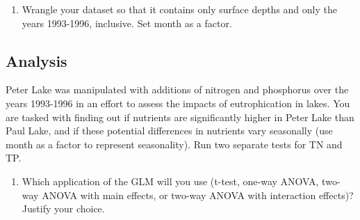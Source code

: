 \documentclass[]{article}
\newenvironment{Shaded}{\begin{snugshade}}{\end{snugshade}}
\newcommand{\CommentTok}[1]{\textcolor[rgb]{0.56,0.35,0.01}{\textit{#1}}}
\newcommand{\DecValTok}[1]{\textcolor[rgb]{0.00,0.00,0.81}{#1}}
\newcommand{\FloatTok}[1]{\textcolor[rgb]{0.00,0.00,0.81}{#1}}
\newcommand{\KeywordTok}[1]{\textcolor[rgb]{0.13,0.29,0.53}{\textbf{#1}}}
\newcommand{\NormalTok}[1]{#1}
\newcommand{\OperatorTok}[1]{\textcolor[rgb]{0.81,0.36,0.00}{\textbf{#1}}}
\newcommand{\StringTok}[1]{\textcolor[rgb]{0.31,0.60,0.02}{#1}}
\providecommand{\tightlist}{%
  \setlength{\itemsep}{0pt}\setlength{\parskip}{0pt}}
\begin{document}
\begin{enumerate}
\def\labelenumi{\arabic{enumi}.}
\setcounter{enumi}{2}
\tightlist
\item
  Wrangle your dataset so that it contains only surface depths and only
  the years 1993-1996, inclusive. Set month as a factor.
\end{enumerate}

\begin{Shaded}
\end{Shaded}

\hypertarget{analysis}{%
\subsection{Analysis}\label{analysis}}

Peter Lake was manipulated with additions of nitrogen and phosphorus
over the years 1993-1996 in an effort to assess the impacts of
eutrophication in lakes. You are tasked with finding out if nutrients
are significantly higher in Peter Lake than Paul Lake, and if these
potential differences in nutrients vary seasonally (use month as a
factor to represent seasonality). Run two separate tests for TN and TP.

\begin{enumerate}
\def\labelenumi{\arabic{enumi}.}
\setcounter{enumi}{3}
\tightlist
\item
  Which application of the GLM will you use (t-test, one-way ANOVA,
  two-way ANOVA with main effects, or two-way ANOVA with interaction
  effects)? Justify your choice.
\end{enumerate}
\end{document}
